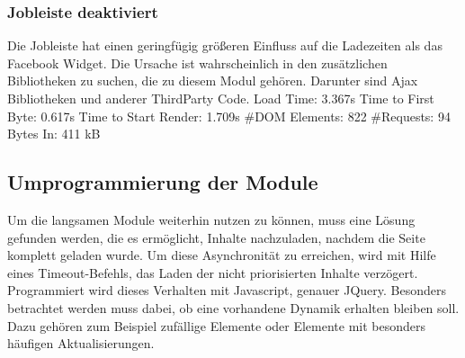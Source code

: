 \subsubsection{Jobleiste deaktiviert} Die Jobleiste hat einen geringfügig größeren Einfluss auf die Ladezeiten als das Facebook Widget. Die Ursache ist wahrscheinlich in den zusätzlichen Bibliotheken zu suchen, die zu diesem Modul gehören. Darunter sind Ajax Bibliotheken und anderer ThirdParty Code. 
Load Time: 3.367s
Time to First Byte: 0.617s %
Time to Start Render: 1.709s
\#DOM Elements: 822 	
\#Requests: 94 
Bytes In: 411 kB

\subsection{Umprogrammierung der Module}
Um die langsamen Module weiterhin nutzen zu können, muss eine Lösung gefunden werden, die es ermöglicht, Inhalte nachzuladen, nachdem die Seite komplett geladen wurde. Um diese Asynchronität zu erreichen, wird mit Hilfe eines Timeout-Befehls, das Laden der nicht priorisierten Inhalte verzögert. Programmiert wird dieses Verhalten mit Javascript, genauer JQuery. Besonders betrachtet werden muss dabei, ob eine vorhandene Dynamik erhalten bleiben soll. Dazu gehören zum Beispiel zufällige Elemente oder Elemente mit besonders häufigen Aktualisierungen.

